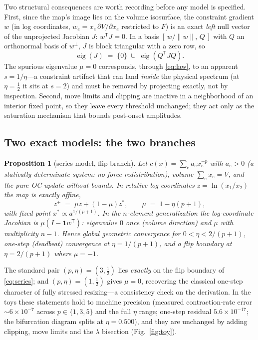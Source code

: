 \documentclass[11pt,a4paper]{article}
\newtheorem{proposition}{Proposition}
\begin{document}
Two structural consequences are worth recording before any model is
specified. First, since the map's image lies on the volume isosurface, the
constraint gradient $w$ (in log coordinates, $w_e = x_e\,\partial
V/\partial x_e$ restricted to $F$) is an exact \emph{left} null vector of
the unprojected Jacobian $J$: $w^{\mathsf T}J=0$. In a basis
$[\,w/\|w\|,\,Q\,]$ with $Q$ an orthonormal basis of $w^{\perp}$, $J$ is
block triangular with a zero row, so
\begin{equation}
  \operatorname{eig}(J) \;=\; \{0\}\;\cup\;\operatorname{eig}(Q^{\mathsf T}JQ).
  \label{eq:block}
\end{equation}
The spurious eigenvalue $\mu=0$ corresponds, through \eqref{eq:law}, to an
apparent $s=1/\eta$---a constraint artifact that can land \emph{inside}
the physical spectrum (at $\eta=\tfrac12$ it sits at $s=2$) and must be
removed by projecting exactly, not by inspection. Second, move limits and
clipping are inactive in a neighborhood of an interior fixed point, so
they leave every threshold unchanged; they act only as the saturation
mechanism that bounds post-onset amplitudes.

\subsection{Two exact models: the two branches}

\begin{proposition}[series model, flip branch]\label{prop:series}
Let $c(x)=\sum_e a_e x_e^{-p}$ with $a_e>0$ (a statically determinate
system: no force redistribution), volume $\sum_e x_e=V$, and the pure OC
update without bounds. In relative log coordinates
$z=\ln(x_1/x_2)$ the map is exactly affine,
\begin{equation}
  z^{+} \;=\; \mu z + (1-\mu)z^{*},
  \qquad
  \mu \;=\; 1-\eta(p+1),
  \label{eq:series}
\end{equation}
with fixed point $x^*\propto a^{1/(p+1)}$. In the $n$-element
generalization the log-coordinate Jacobian is $\mu(I-\mathbf 1 w^{\mathsf T})$:
eigenvalue $0$ once (volume direction) and $\mu$ with multiplicity $n-1$.
Hence global geometric convergence for $0<\eta<2/(p+1)$, one-step (deadbeat)
convergence at $\eta=1/(p+1)$, and a flip boundary at $\eta=2/(p+1)$ where
$\mu=-1$.
\end{proposition}

The standard pair $(p,\eta)=(3,\tfrac12)$ lies \emph{exactly} on the flip
boundary of \eqref{eq:series}; and $(p,\eta)=(1,\tfrac12)$ gives $\mu=0$,
recovering the classical one-step character of fully stressed resizing---a
consistency check on the derivation. In the toys these statements hold to
machine precision (measured contraction-rate error ${\sim}6\times10^{-7}$
across $p\in\{1,3,5\}$ and the full $\eta$ range; one-step residual
$5.6\times10^{-17}$; the bifurcation diagram splits at $\eta=0.500$), and
they are unchanged by adding clipping, move limits and the $\lambda$
bisection (Fig.~\ref{fig:toy}).
\end{document}

